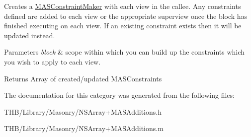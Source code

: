 Creates a \mbox{\hyperlink{interface_m_a_s_constraint_maker}{M\+A\+S\+Constraint\+Maker}} with each view in the callee. Any constraints defined are added to each view or the appropriate superview once the block has finished executing on each view. If an existing constraint exists then it will be updated instead.


\begin{DoxyParams}{Parameters}
{\em block} & scope within which you can build up the constraints which you wish to apply to each view.\\
\hline
\end{DoxyParams}
\begin{DoxyReturn}{Returns}
Array of created/updated M\+A\+S\+Constraints 
\end{DoxyReturn}


The documentation for this category was generated from the following files\+:\begin{DoxyCompactItemize}
\item 
T\+H\+B/\+Library/\+Masonry/N\+S\+Array+\+M\+A\+S\+Additions.\+h\item 
T\+H\+B/\+Library/\+Masonry/N\+S\+Array+\+M\+A\+S\+Additions.\+m\end{DoxyCompactItemize}
